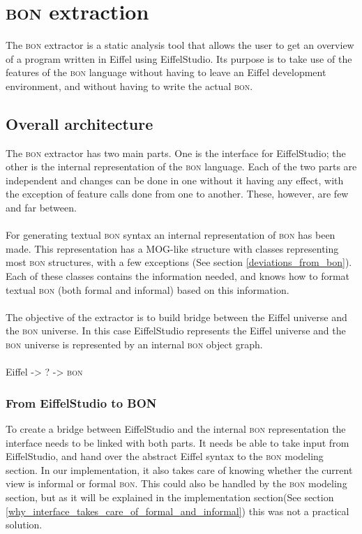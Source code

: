 \section{\textsc{bon} extraction}
The \textsc{bon} extractor is a static analysis tool that allows the user to get an overview of a program written in Eiffel using EiffelStudio. Its purpose is to take use of the features of the \textsc{bon} language without having to leave an Eiffel development environment, and without having to write the actual \textsc{bon}.

\subsection{Overall architecture}
The \textsc{bon} extractor has two main parts. One is the interface for EiffelStudio; the other is the internal representation of the \textsc{bon} language. Each of the two parts are independent and changes can be done in one without it having any effect, with the exception of feature calls done from one to another. These, however, are few and far between. 

\paragraph{}
For generating textual \textsc{bon} syntax an internal representation of \textsc{bon} has been made. This representation has a MOG-like structure with classes representing most \textsc{bon} structures, with a few exceptions (See section \ref{deviations_from_bon}).  Each of these classes contains the information needed, and knows how to format textual \textsc{bon} (both formal and informal) based on this information. 

\paragraph{}
The objective of the extractor is to build bridge between the Eiffel universe and the \textsc{bon} universe.  In this case EiffelStudio represents the Eiffel universe and the \textsc{bon} universe is represented by an internal \textsc{bon} object graph.

\paragraph{}
Eiffel -> ? -> \textsc{bon}

\subsubsection{From EiffelStudio to BON}
To create a bridge between EiffelStudio and the internal \textsc{bon} representation the interface needs to be linked with both parts. It needs be able to take input from EiffelStudio, and hand over the abstract Eiffel syntax to the \textsc{bon} modeling section. In our implementation, it also takes care of knowing whether the current view is informal or formal \textsc{bon}. This could also be handled by the \textsc{bon} modeling section, but as it will be explained in the implementation section(See section \ref{why_interface_takes_care_of_formal_and_informal}) this was not a practical solution.

